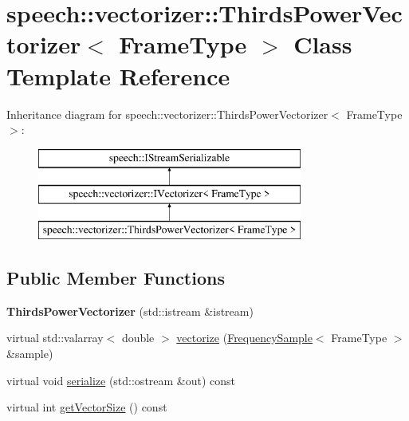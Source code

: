 \hypertarget{classspeech_1_1vectorizer_1_1ThirdsPowerVectorizer}{\section{speech\+:\+:vectorizer\+:\+:Thirds\+Power\+Vectorizer$<$ Frame\+Type $>$ Class Template Reference}
\label{classspeech_1_1vectorizer_1_1ThirdsPowerVectorizer}
}
Inheritance diagram for speech\+:\+:vectorizer\+:\+:Thirds\+Power\+Vectorizer$<$ Frame\+Type $>$\+:\begin{figure}[H]
\begin{center}
\leavevmode
\includegraphics[height=3.000000cm]{classspeech_1_1vectorizer_1_1ThirdsPowerVectorizer}
\end{center}
\end{figure}
\subsection*{Public Member Functions}
\begin{DoxyCompactItemize}
\item 
\hypertarget{classspeech_1_1vectorizer_1_1ThirdsPowerVectorizer_a44431bd02c11d430a2206bcf4950008b}{{\bfseries Thirds\+Power\+Vectorizer} (std\+::istream \&istream)}\label{classspeech_1_1vectorizer_1_1ThirdsPowerVectorizer_a44431bd02c11d430a2206bcf4950008b}

\item 
virtual std\+::valarray$<$ double $>$ \hyperlink{classspeech_1_1vectorizer_1_1ThirdsPowerVectorizer_aa43af654f25abdb9a1698815edaf900c}{vectorize} (\hyperlink{classspeech_1_1raw__data_1_1FrequencySample}{Frequency\+Sample}$<$ Frame\+Type $>$ \&sample)
\item 
virtual void \hyperlink{classspeech_1_1vectorizer_1_1ThirdsPowerVectorizer_ab27c49171171fa2af908d9f3df0712db}{serialize} (std\+::ostream \&out) const 
\item 
virtual int \hyperlink{classspeech_1_1vectorizer_1_1ThirdsPowerVectorizer_a4680e178d5ef376cf2e4f6d47487e047}{get\+Vector\+Size} () const 
\end{DoxyCompactItemize}
